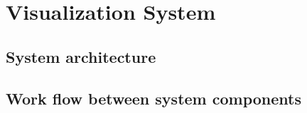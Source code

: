 \chapter{Visualization System}

\section{System architecture}

\section{Work flow between system components}